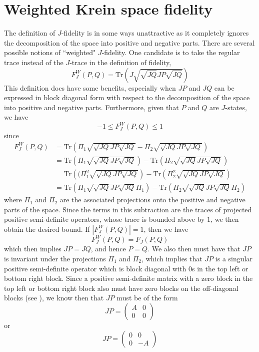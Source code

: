 \documentclass{amsart}
\numberwithin{equation}{section}
\theoremstyle{definition}
\theoremstyle{plain}
\theoremstyle{solutionstyle}
\begin{document}
\section{Weighted Krein space fidelity}\label{Section 7}
The definition of $J$-fidelity is in some ways unattractive as it completely ignores the decomposition of the space into positive and negative parts. There are several possible notions of ``weighted" $J$-fidelity. One candidate is to take the regular trace instead of the $J$-trace in the definition of fidelity, 
\begin{equation*}F_J^W(P,Q)=\mathrm{Tr}\left(J\sqrt{\sqrt{JQ}JP\sqrt{JQ}}\right)\end{equation*}
This definition does have some benefits, especially when $JP$ and $JQ$ can be expressed in block diagonal form with respect to the decomposition of the space into positive and negative parts. Furthermore, given that $P$ and $Q$ are $J$-states, we have 
\begin{equation*}-1\leq F_J^W(P,Q)\leq 1\end{equation*} since 
\begin{align*}
    F_J^W(P,Q)&=\mathrm{Tr}\left(\Pi_1\sqrt{\sqrt{JQ}JP\sqrt{JQ}}-\Pi_2\sqrt{\sqrt{JQ}JP\sqrt{JQ}}\right)\\
               &=\mathrm{Tr}\left(\Pi_1\sqrt{\sqrt{JQ}JP\sqrt{JQ}}\right)-\mathrm{Tr}\left(\Pi_2\sqrt{\sqrt{JQ}JP\sqrt{JQ}}\right)\\
               &=\mathrm{Tr}\left((\Pi_1^2\sqrt{\sqrt{JQ}JP\sqrt{JQ}}\right)-\mathrm{Tr}\left(\Pi_2^2\sqrt{\sqrt{JQ}JP\sqrt{JQ}}\right)\\
               &=\mathrm{Tr}\left(\Pi_1\sqrt{\sqrt{JQ}JP\sqrt{JQ}}\Pi_1\right)-\mathrm{Tr}\left(\Pi_2\sqrt{\sqrt{JQ}JP\sqrt{JQ}}\Pi_2\right)
\end{align*}
where $\Pi_1$ and $\Pi_2$ are the associated projections onto the positive and negative parts of the space.
Since the terms in this subtraction are the traces of projected positive semi-definite operators, whose trace is bounded above by $1$, we then obtain the desired bound. If $|F^W_J(P,Q)|=1$, then we have 
\begin{equation*}F^W_J(P,Q)=F_J(P,Q)\end{equation*} which then implies $JP=JQ$, and hence $P=Q$. We also then must have that $JP$ is invariant under the projections $\Pi_1$ and $\Pi_2$, which implies that $JP$ is a singular positive semi-definite operator which is block diagonal with $0$s in the top left or bottom right block. Since a positive semi-definite matrix with a zero block in the top left or bottom right block also must have zero blocks on the off-diagonal blocks (see \citep[pp.~144--146]{Watrous_2018}), we know then that $JP$ must be of the form \begin{equation*}JP=\begin{pmatrix}
    A & 0\\
    0 & 0
\end{pmatrix}\end{equation*} or \begin{equation*}JP=\begin{pmatrix}
    0&0\\
    0&-A
\end{pmatrix}\end{equation*}
\end{document}

